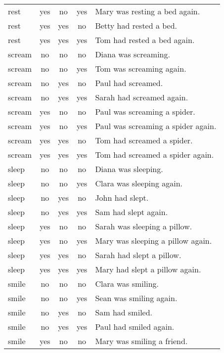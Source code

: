 \begin{longtable}{l|ccc|p{5cm}}
rest    & yes  & no   & yes  & Mary was resting a bed again.          \\
rest    & yes  & yes  & no   & Betty had rested a bed.                \\
rest    & yes  & yes  & yes  & Tom had rested a bed again.            \\
scream  & no   & no   & no   & Diana was screaming.                   \\
scream  & no   & no   & yes  & Tom was screaming again.               \\
scream  & no   & yes  & no   & Paul had screamed.                     \\
scream  & no   & yes  & yes  & Sarah had screamed again.              \\
scream  & yes  & no   & no   & Paul was screaming a spider.           \\
scream  & yes  & no   & yes  & Paul was screaming a spider again.     \\
scream  & yes  & yes  & no   & Tom had screamed a spider.             \\
scream  & yes  & yes  & yes  & Tom had screamed a spider again.       \\
sleep   & no   & no   & no   & Diana was sleeping.                    \\
sleep   & no   & no   & yes  & Clara was sleeping again.              \\
sleep   & no   & yes  & no   & John had slept.                        \\
sleep   & no   & yes  & yes  & Sam had slept again.                   \\
sleep   & yes  & no   & no   & Sarah was sleeping a pillow.           \\
sleep   & yes  & no   & yes  & Mary was sleeping a pillow again.      \\
sleep   & yes  & yes  & no   & Sarah had slept a pillow.              \\
sleep   & yes  & yes  & yes  & Mary had slept a pillow again.         \\
smile   & no   & no   & no   & Clara was smiling.                     \\
smile   & no   & no   & yes  & Sean was smiling again.                \\
smile   & no   & yes  & no   & Sam had smiled.                        \\
smile   & no   & yes  & yes  & Paul had smiled again.                 \\
smile   & yes  & no   & no   & Mary was smiling a friend.             \\

\end{longtable}
